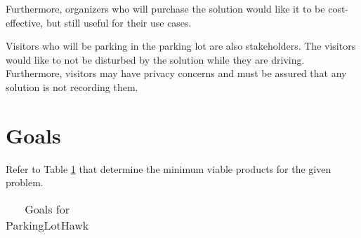 \documentclass{article}
\begin{document}
Furthermore, organizers who will purchase the solution would like it to be cost-effective, but still useful for their use cases.

Visitors who will be parking in the parking lot are also stakeholders. The visitors would like to not be disturbed by the solution while they are driving. Furthermore, visitors may have privacy concerns and must be assured that any solution is not recording them.

\section{Goals}

Refer to Table \ref{table:Goals} that determine the minimum viable products for the given problem.


\begin{table}
\centering
\caption {Goals for ParkingLotHawk} 
\label{table:Goals}
\begin{tabular}{ | m{5cm} | m{7cm} | } 


\end{tabular}
\end{table}
\end{document}
